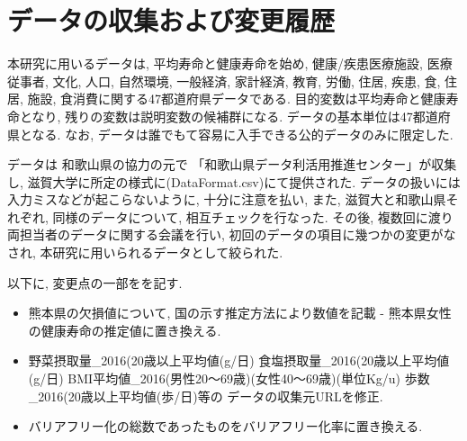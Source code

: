 \chapter{データの収集および変更履歴}


本研究に用いるデータは,
平均寿命と健康寿命を始め,
 健康/疾患医療施設, 医療従事者, 文化, 人口, 自然環境, 一般経済, 家計経済, 教育, 労働, 住居, 疾患, 食, 住居, 施設, 食消費に関する47都道府県データである.
目的変数は平均寿命と健康寿命となり,
残りの変数は説明変数の候補群になる.
データの基本単位は47都道府県となる.
なお,
データは誰でもて容易に入手できる公的データのみに限定した.


データは
和歌山県の協力の元で
「和歌山県データ利活用推進センター」が収集し,
滋賀大学に所定の様式に(DataFormat.csv)にて提供された.
データの扱いには入力ミスなどが起こらないように,
十分に注意を払い,
また, 滋賀大と和歌山県それぞれ,
同様のデータについて,
相互チェックを行なった.
その後, 複数回に渡り両担当者のデータに関する会議を行い,
初回のデータの項目に幾つかの変更がなされ,
本研究に用いられるデータとして絞られた.

以下に, 変更点の一部をを記す.
\begin{itemize}
	\item
		熊本県の欠損値について, 国の示す推定方法により数値を記載 -
熊本県女性の健康寿命の推定値に置き換える.

\item
野菜摂取量\_2016(20歳以上平均値(g/日)
食塩摂取量\_2016(20歳以上平均値(g/日)
BMI平均値\_2016(男性20〜69歳)(女性40〜69歳)(単位Kg/u)
歩数\_2016(20歳以上平均値(歩/日)等の
データの収集元URLを修正.


%

\item

バリアフリー化の総数であったものをバリアフリー化率に置き換える.
%
%

\end{itemize}



